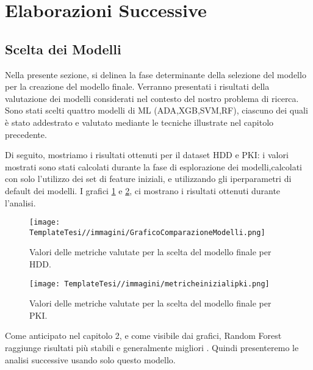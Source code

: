 \section{Elaborazioni Successive}
\subsection{Scelta dei Modelli}
\begin{flushleft}
    
Nella presente sezione, si delinea la fase determinante della selezione del modello per la creazione del modello finale. Verranno presentati i risultati della valutazione dei modelli considerati nel contesto del nostro problema di ricerca. Sono stati scelti quattro modelli di ML (ADA,XGB,SVM,RF), ciascuno dei quali è stato addestrato e valutato mediante le tecniche illustrate nel capitolo precedente.


Di seguito, %
mostriamo i risultati ottenuti per il dataset HDD e PKI:
i valori mostrati sono stati calcolati durante la fase di esplorazione dei modelli,calcolati con solo l'utilizzo dei set di feature iniziali, e utilizzando gli iperparametri di default dei modelli.
I grafici \ref{fig:graficosceltamodello} e \ref{fig:graficosceltamodellopki}, ci mostrano i risultati ottenuti durante l'analisi.


    
    \begin{figure}[H]
        \centering
        \texttt{[image: TemplateTesi//immagini/GraficoComparazioneModelli.png]}
        \caption{Valori delle metriche valutate per la scelta del modello finale per HDD.}
        \label{fig:graficosceltamodello}
    \end{figure}

\begin{figure}[H]
        \centering
        \texttt{[image: TemplateTesi//immagini/metricheinizialipki.png]}
        \caption{Valori delle metriche valutate per la scelta del modello finale per PKI.}
        \label{fig:graficosceltamodellopki}
    \end{figure}
Come anticipato nel capitolo 2, e come visibile dai grafici, Random Forest raggiunge risultati più stabili e generalmente migliori . Quindi presenteremo le analisi successive usando solo questo modello.

\end{flushleft}

